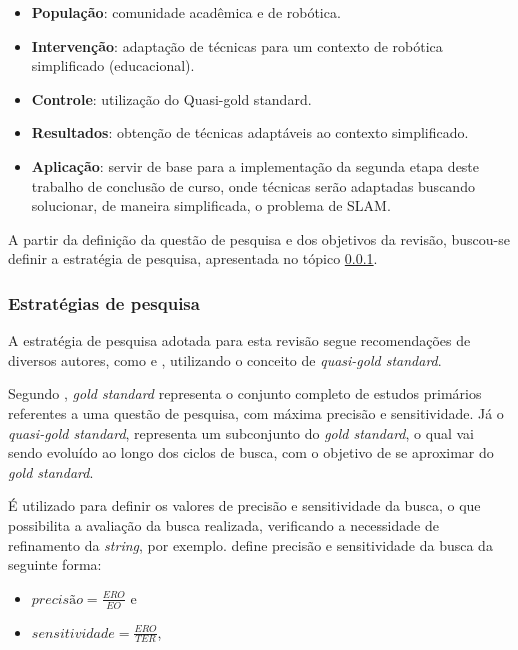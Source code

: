 		\begin{itemize}
			\item \textbf{População}: comunidade acadêmica e de robótica.
			\item \textbf{Intervenção}: adaptação de técnicas para um contexto de robótica simplificado (educacional).
			\item \textbf{Controle}: utilização do Quasi-gold standard.
			\item \textbf{Resultados}: obtenção de técnicas adaptáveis ao contexto simplificado.
			\item \textbf{Aplicação}: servir de base para a implementação da segunda etapa deste trabalho de conclusão de curso, onde técnicas serão adaptadas buscando solucionar, de maneira simplificada, o problema de SLAM.

		\end{itemize} 

		A partir da definição da questão de pesquisa e dos objetivos da revisão, buscou-se definir a estratégia de pesquisa, apresentada no tópico \ref{sub:estrategias_pesquisa}.

		\subsubsection{Estratégias de pesquisa}
		\label{sub:estrategias_pesquisa}

		A estratégia de pesquisa adotada para esta revisão segue recomendações de diversos autores, como \cite{Kitchenham} e \cite{systematicReviewEngSoft}, utilizando o conceito de \textit{quasi-gold standard}.

		Segundo \cite{quasi_goldES}, \textit{gold standard} representa o conjunto completo de estudos primários referentes a uma questão de pesquisa, com máxima precisão e sensitividade. Já o \textit{quasi-gold standard}, representa um subconjunto do \textit{gold standard}, o qual vai sendo evoluído ao longo dos ciclos de busca, com o objetivo de se aproximar do \textit{gold standard}. 

		É utilizado para definir os valores de precisão e sensitividade da busca, o que possibilita a avaliação da busca realizada, verificando a necessidade de refinamento da \textit{string}, por exemplo. \cite{quasi_goldES} define precisão e sensitividade da busca da seguinte forma:

		\begin{itemize}

			\item $precisão = \frac{ERO}{EO}$ e

			\item $sensitividade = \frac{ERO}{TER}$,
		\end{itemize}

